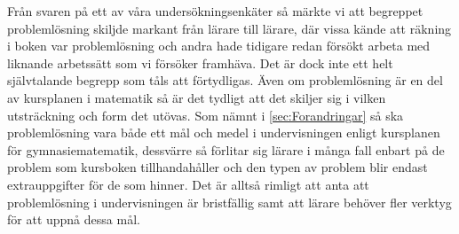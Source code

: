 \textcolor{Mahogany}{Från svaren på ett av våra undersökningsenkäter så märkte vi att begreppet problemlösning skiljde markant från lärare till lärare, där vissa kände att räkning i boken var problemlösning och andra hade tidigare redan försökt arbeta med liknande arbetssätt som vi försöker framhäva. Det är dock inte ett helt självtalande begrepp som tåls att förtydligas. Även om problemlösning är en del av kursplanen i matematik så är det tydligt att det skiljer sig i vilken utsträckning och form det utövas. Som nämnt i \ref{sec:Forandringar} så ska problemlösning vara både ett mål och medel i undervisningen enligt kursplanen för gymnasiematematik, dessvärre så förlitar sig lärare i många fall enbart på de problem som kursboken tillhandahåller och den typen av problem blir endast extrauppgifter för de som hinner\cite{2010UndervisningenGymnasieskolan}. Det är alltså rimligt att anta att problemlösning i undervisningen är bristfällig samt att lärare behöver fler verktyg för att uppnå dessa mål.}